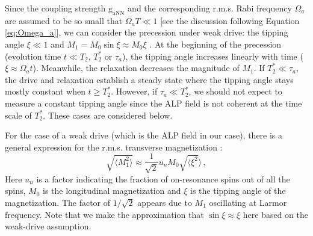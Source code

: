 \documentclass{WileyMSP-template}
\newcommand{\YZ}[1]{\textcolor{purple}{Yuzhe: #1}}
\newcommand{\HB}[1]{\textcolor{orange}{Hendrik: #1}}
\providecommand{\DIFaddtex}[1]{{\protect\color{blue}\uwave{#1}}} %
\providecommand{\DIFaddbegin}{} %
\providecommand{\DIFaddend}{} %
\providecommand{\DIFadd}[1]{\texorpdfstring{\DIFaddtex{#1}}{#1}} %
\begin{document}
	
	Since the coupling strength $\mathrm{g_{aNN}}$ and the corresponding r.m.s. Rabi frequency $\Omega_a$ are assumed to be so small that $\Omega_a T \ll 1$ $[$see the discussion following Equation\,\eqref{eq:Omega_a}$]$, we can consider the precession under weak drive: the tipping angle $\xi \ll 1$ and $M_{1} = M_{0}\sin\xi \approx  M_{0}\xi$ \DIFaddbegin \DIFadd{\mbox{%
\cite{Abragam1961ThePO}}\hskip0pt%
}\DIFaddend . At the beginning of the precession (evolution time $t \ll T_2,\, T_2^*$ or $\tau_a$), the tipping angle increases linearly with time ($\xi \approx \Omega_a t$). 
	Meanwhile, the relaxation decreases the magnitude of $M_{1}$. 
	If $T_2^* \ll \tau_a$, the drive and relaxation establish a steady state where the tipping angle stays mostly constant when $t\geq T_2^*$. 
	However, if $\tau_a \ll T_2^*$, 
	we should not expect to measure a constant tipping angle since the ALP field is not coherent at the time scale of $T_2^*$. 
	These cases are considered below. 

	For the case of a weak drive (which is the ALP field in our case), there is a general expression for the r.m.s. transverse magnetization \cite{Abragam1961ThePO}:
	\begin{equation}
		\sqrt{\langle M_{1}^2 \rangle} \approx \dfrac{1}{\sqrt{2}} u_n M_{0} \sqrt{\langle  \xi^2 }\rangle 
		\,,\label{eq:M1_u_M0_Omega}
	\end{equation}
	Here $u_n$ is a factor indicating the fraction of on-resonance spins out of all the spins, $M_{0}$ is the longitudinal magnetization and $\xi$ is the tipping angle of the magnetization.
	The factor of $1/\sqrt{2}$ appears due to $M_1$ oscillating at Larmor frequency. 
	Note that we make the approximation that $\sin\xi \approx \xi$ here based on the weak-drive assumption. 
\end{document}
